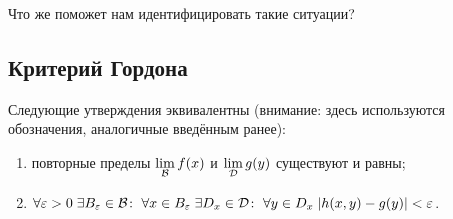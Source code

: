 Что же поможет нам идентифицировать такие ситуации?

\subsection{Критерий Гордона}

\begin{Theorem}
    Следующие утверждения эквивалентны (внимание: здесь используются обозначения, аналогичные введённым ранее):
    \begin{enumerate}
        \item повторные пределы $\lim\limits_{\mathcal{B}}f(x)$ и $\lim\limits_{\mathcal{D}} g(y)$ существуют и равны;
        \item $\forall \varepsilon>0\; \exists B_\varepsilon \in \mathcal{B}\colon\; \forall x\in B_\varepsilon\; \exists D_x\in\mathcal{D}\colon \; \forall y \in D_x\; |h(x,y) -g(y)|<\varepsilon$.
    \end{enumerate}
\end{Theorem}
